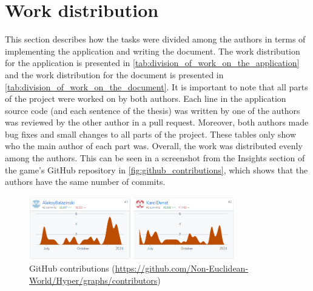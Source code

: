 \section{Work distribution}\label{sec:division_of_work}
This section describes how the tasks were divided among the authors in terms of implementing the application and writing the document.
The work distribution for the application is presented in \autoref{tab:division_of_work_on_the_application} and the work distribution for the document is presented in \autoref{tab:division_of_work_on_the_document}.
It is important to note that all parts of the project were worked on by both authors.
Each line in the application source code (and each sentence of the thesis) was written by one of the authors was reviewed by the other author in a pull request.
Moreover, both authors made bug fixes and small changes to all parts of the project.
These tables only show who the main author of each part was.
Overall, the work was distributed evenly among the authors.
This can be seen in a screenshot from the Insights section of the game's GitHub repository in \autoref{fig:github_contributions}, which shows that the authors have the same number of commits.

\begin{figure}[h]
    \centering
    \includegraphics[width=0.8\textwidth]{chapters/introduction/work_distribution/resources/github_contributions.png}
    \caption{GitHub contributions (\url{https://github.com/Non-Euclidean-World/Hyper/graphs/contributors})}
    \label{fig:github_contributions}
\end{figure}


